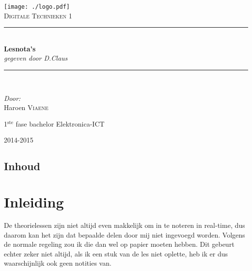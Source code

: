 \documentclass[11pt, a4paper]{report}
\newcommand{\HRule}{\rule{\linewidth}{0.5mm}}
\begin{document}
\begin{titlepage}
\begin{center}
\texttt{[image: ./logo.pdf]}~\\[1cm]


\textsc{\Large Digitale Technieken 1}\\[0.5cm]

\HRule \\[0.4cm]
{ \LARGE \bfseries Lesnota's}\\[0.4cm]
{\large \textit{gegeven door D.Claus}}\\[0.2cm]

\HRule \\[1.5cm]

\begin{minipage}{0.4\textwidth}
\begin{flushleft} \large
\emph{Door: }\\
Haroen \textsc{Viaene}\\

\end{flushleft}
\end{minipage}
\begin{minipage}{0.4\textwidth}
\begin{flushright} \large
\large{1$^{\text{ste}}$ fase bachelor Elektronica-ICT}\\
\end{flushright}
\end{minipage}

\vfill

{\large 2014-2015}

\end{center}
\end{titlepage}

\newpage

\section*{Inhoud}

\tableofcontents

\newpage

\chapter{Inleiding}

De theorielessen zijn niet altijd even makkelijk om in te noteren in real-time, dus daarom kan het zijn dat bepaalde delen door mij niet ingevoegd worden. Volgens de normale regeling zou ik die dan wel op papier moeten hebben. Dit gebeurt echter zeker niet altijd, als ik een stuk van de les niet oplette, heb ik er dus waarschijnlijk ook geen notities van.
\end{document}
